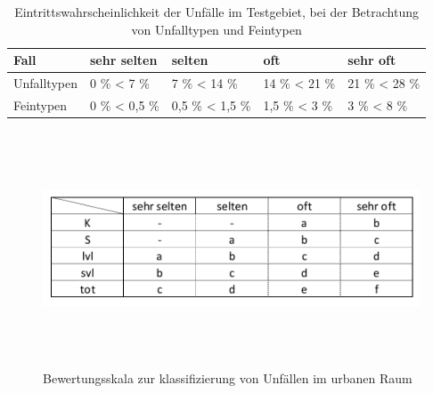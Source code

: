 \begin{table}[htpb]
	\scriptsize
	\caption[Eintrittswahrscheinlichkeit der Unfälle im Testgebiet, bei der Betrachtung von Unfalltypen und Feintypen]{Eintrittswahrscheinlichkeit der Unfälle im Testgebiet, bei der Betrachtung von Unfalltypen und Feintypen}\label{tab:Haeufigkeits Bereiche}
	\centering
	\begin{tabular}{l l l  l l}
		\toprule
		Fall & sehr selten & selten & oft & sehr oft \\
		\midrule
		Unfalltypen & 0 \% < 7 \%  & 7 \% < 14 \% & 14 \% < 21 \% & 21 \% < 28 \%\\
		Feintypen & 0 \% < 0,5 \% & 0,5 \% < 1,5 \% & 1,5 \% < 3 \% & 3 \% < 8 \%\\
		\bottomrule
	\end{tabular}
\end{table}


\begin{savenotes}
	\begin{figure}[H]
		\centering
		\includegraphics[width=12cm,height=7cm]{figures/Bewertungsskala}
		\caption[Bewertungsskala zur klassifizierung von Unfällen im urbanen Raum]{Bewertungsskala zur klassifizierung von Unfällen im urbanen Raum}\label{fig:Bewertungsskala}
	\end{figure}
\end{savenotes}


